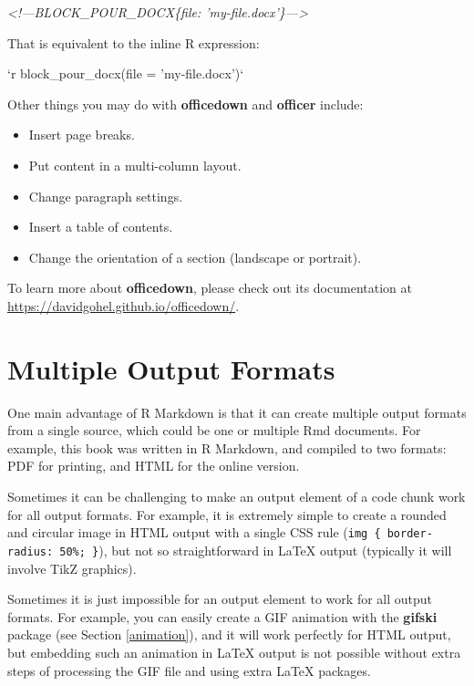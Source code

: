 \documentclass[
  11pt,
]{krantz}
\newenvironment{Shaded}{\begin{snugshade}}{\end{snugshade}}
\newcommand{\BaseNTok}[1]{\textcolor[rgb]{0.06,0.06,0.06}{#1}}
\newcommand{\CommentTok}[1]{\textcolor[rgb]{0.37,0.37,0.37}{\textit{#1}}}
\begin{document}
\begin{Shaded}
\begin{Highlighting}[]
\CommentTok{<!---BLOCK_POUR_DOCX\{file: 'my-file.docx'\}--->}
\end{Highlighting}
\end{Shaded}

That is equivalent to the inline R expression:

\begin{Shaded}
\begin{Highlighting}[]
\BaseNTok{`r block_pour_docx(file = 'my-file.docx')`}
\end{Highlighting}
\end{Shaded}

Other things you may do with \textbf{officedown} and \textbf{officer} include:

\begin{itemize}
\item
  Insert page breaks.
\item
  Put content in a multi-column layout.
\item
  Change paragraph settings.
\item
  Insert a table of contents.
\item
  Change the orientation of a section (landscape or portrait).
\end{itemize}

To learn more about \textbf{officedown}, please check out its documentation at \url{https://davidgohel.github.io/officedown/}.

\hypertarget{multi-formats}{%
\chapter{Multiple Output Formats}\label{multi-formats}}

One main advantage of R Markdown is that it can create multiple output formats from a single source, which could be one or multiple Rmd documents. For example, this book was written in R Markdown, and compiled to two formats: PDF for printing, and HTML for the online version.

Sometimes it can be challenging to make an output element of a code chunk work for all output formats. For example, it is extremely simple to create a rounded and circular image in HTML output with a single CSS rule (\texttt{img\ \{\ border-radius:\ 50\%;\ \}}), but not so straightforward in LaTeX output (typically it will involve TikZ graphics).

Sometimes it is just impossible for an output element to work for all output formats. For example, you can easily create a GIF animation with the \textbf{gifski} package (see Section \ref{animation}), and it will work perfectly for HTML output, but embedding such an animation in LaTeX output is not possible without extra steps of processing the GIF file and using extra LaTeX packages.
\end{document}
